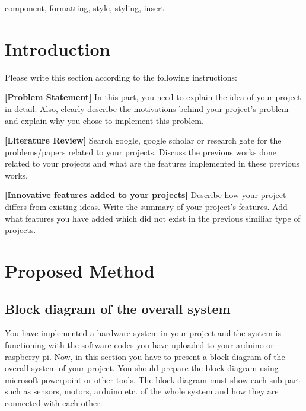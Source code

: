 \documentclass[conference]{IEEEtran}
\begin{document}
\begin{IEEEkeywords}
component, formatting, style, styling, insert
\end{IEEEkeywords}

\section{Introduction}

\noindent Please write this section according to the following instructions:

\noindent \textbf{[Problem Statement]} In this part, you need to explain the idea of your project in detail. Also, clearly describe the motivations behind your project's problem and explain why you chose to implement this problem.

\noindent \textbf{[Literature Review]} Search google, google scholar or research gate for the problems/papers related to your projects. Discuss the previous works done related to your projects and what are the features implemented in these previous works.

\noindent \textbf{[Innovative features added to your projects]} Describe how your project differs from existing ideas. Write the summary of your project's features. Add what features you have added which did not exist in the previous similiar type of projects.

\section{Proposed Method}

\subsection{Block diagram of the overall system}

You have implemented a hardware system in your project and the system is functioning with the software codes you have uploaded to your arduino or raspberry pi. Now, in this section you have to present a block diagram of the overall system of your project. You should prepare the block diagram using microsoft powerpoint or other tools. The block diagram must show each sub part such as sensors, motors, arduino etc. of the whole system and how they are connected with each other.
\end{document}
